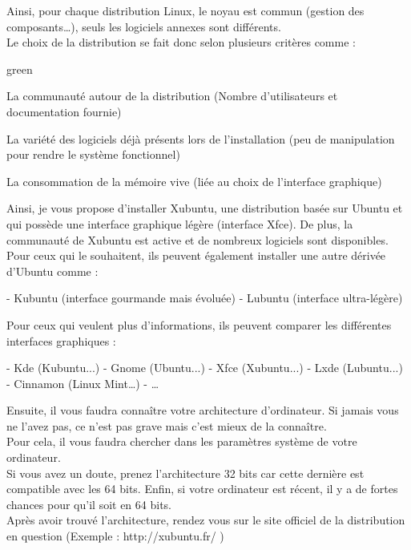 Ainsi, pour chaque distribution Linux, le noyau est commun (gestion des composants…), 
seuls les logiciels annexes sont différents.\\
Le choix de la distribution se fait donc selon plusieurs critères comme : \\

\begin{items}{green}{\faviconLeaf}
\item La communauté autour de la distribution (Nombre d’utilisateurs et documentation fournie)
\item La variété des logiciels déjà présents lors de l’installation (peu de manipulation pour rendre 
le système fonctionnel)
\item La consommation de la mémoire vive (liée au choix de l’interface graphique)
\end{items}

Ainsi, je vous propose d’installer Xubuntu, une distribution basée sur Ubuntu et qui possède une 
interface graphique légère (interface Xfce). De plus, la communauté de Xubuntu est active et de nombreux 
logiciels sont disponibles.\\


Pour ceux qui le souhaitent, ils peuvent également installer une autre dérivée d'Ubuntu comme :

- Kubuntu  (interface gourmande mais évoluée)
- Lubuntu  (interface ultra-légère)

Pour ceux qui veulent plus d’informations, ils peuvent comparer les différentes interfaces graphiques :

- Kde			(Kubuntu...)
- Gnome		(Ubuntu...)
- Xfce			(Xubuntu...)
- Lxde			(Lubuntu...)
- Cinnamon 		(Linux Mint…)
- …


Ensuite, il vous faudra connaître votre architecture d’ordinateur. Si jamais vous ne l’avez pas, 
ce n’est pas grave mais c’est mieux de la connaître.\\
Pour cela, il vous faudra chercher dans les paramètres système de votre ordinateur.\\


Si vous avez un doute, prenez l’architecture 32 bits car cette dernière est compatible avec 
les 64 bits. Enfin, si votre ordinateur est récent, il y a de fortes chances pour qu’il soit en 64 bits.\\


Après avoir trouvé l'architecture, rendez vous sur le site officiel de la distribution en question 
(Exemple : http://xubuntu.fr/ )\\

